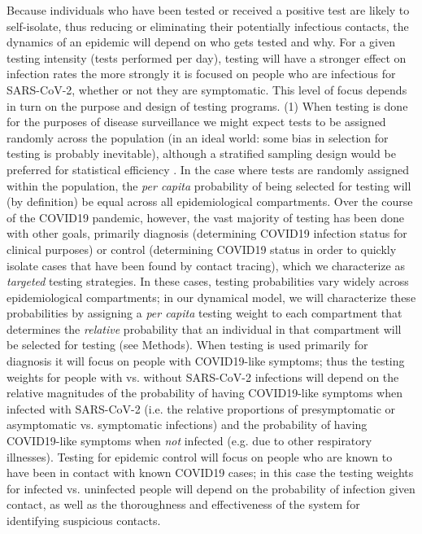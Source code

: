 \documentclass[12pt]{article}
\theoremstyle{definition} %
\begin{document}
Because individuals who have been tested or received a positive test are likely to self-isolate, thus reducing or eliminating  their potentially infectious contacts, the dynamics of an epidemic will depend on who gets tested and
why. For a given testing intensity (tests performed per day), testing will have a stronger effect on infection rates
the more strongly it is focused on people who are infectious for SARS-CoV-2, whether or not they are symptomatic.
This level of focus depends in turn on the purpose and design of testing programs.
(1) When testing is done for the purposes of disease surveillance \citep{foddai2020base}
we might expect tests to be assigned randomly across the population (in an ideal world: some bias in selection for testing is probably inevitable), although a stratified sampling design would be preferred for statistical efficiency \citep{cleevely2020workable}.
In the case where tests are randomly assigned within the population, the \emph{per capita} probability of being selected for testing will (by definition) be equal across all epidemiological compartments. 
Over the course of the COVID19 pandemic, however, the vast majority of testing has been done with other goals,
primarily diagnosis (determining COVID19 infection status for clinical purposes) or control (determining COVID19 status
in order to quickly isolate cases that have been found by contact tracing), which we characterize
as \emph{targeted} testing strategies.
In these cases, testing probabilities vary widely across epidemiological compartments; in our dynamical model,
we will characterize these probabilities by assigning a \emph{per capita} testing weight to each compartment
that determines the \emph{relative} probability that an individual in that compartment will be selected for
testing (see Methods). When testing is used primarily for diagnosis it will focus on people with COVID19-like symptoms; thus the testing weights for people with vs. without SARS-CoV-2 infections will depend on the relative magnitudes of the probability of having COVID19-like symptoms when infected with SARS-CoV-2 (i.e. the relative proportions of presymptomatic or asymptomatic vs. symptomatic infections) and the probability of having COVID19-like symptoms when \emph{not} infected (e.g. due to other respiratory illnesses). Testing for epidemic control will focus on people who are known to have been in contact with known COVID19 cases; in this case the testing weights for infected vs. uninfected people will depend on the probability of infection given contact, as well as the thoroughness and effectiveness of the system for identifying suspicious contacts.
\end{document}
